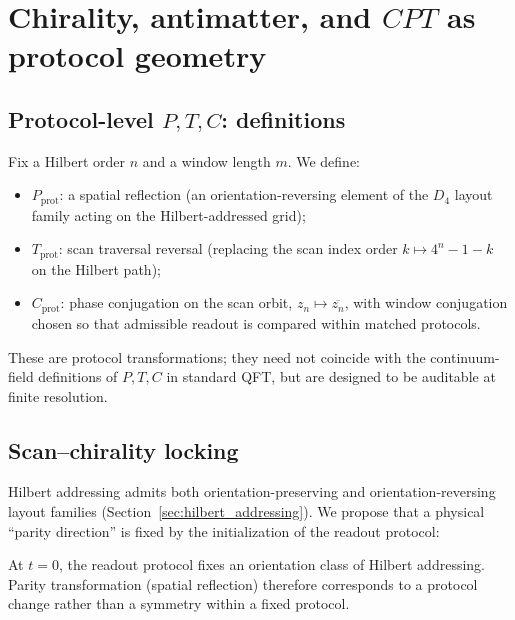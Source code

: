 
\section{Chirality, antimatter, and \texorpdfstring{$CPT$}{CPT} as protocol geometry}
\label{sec:chirality_antimatter}

\subsection{Protocol-level \texorpdfstring{$P,T,C$}{P,T,C}: definitions}
\label{subsec:ptc_definitions}

\begin{definition}\label{def:ptc_protocol}
Fix a Hilbert order $n$ and a window length $m$.
We define:
\begin{itemize}
\item $P_{\mathrm{prot}}$: a spatial reflection (an orientation-reversing element of the $D_4$ layout family acting on the Hilbert-addressed grid);
\item $T_{\mathrm{prot}}$: scan traversal reversal (replacing the scan index order $k\mapsto 4^n-1-k$ on the Hilbert path);
\item $C_{\mathrm{prot}}$: phase conjugation on the scan orbit, $z_n\mapsto \overline{z_n}$, with window conjugation chosen so that admissible readout is compared within matched protocols.
\end{itemize}
These are protocol transformations; they need not coincide with the continuum-field definitions of $P,T,C$ in standard QFT, but are designed to be auditable at finite resolution.
\end{definition}

\subsection{Scan--chirality locking}
\label{subsec:scl}

Hilbert addressing admits both orientation-preserving and orientation-reversing layout families (Section~\ref{sec:hilbert_addressing}).
We propose that a physical ``parity direction'' is fixed by the initialization of the readout protocol:

\begin{assumption}
\label{ax:scl}
At $t=0$, the readout protocol fixes an orientation class of Hilbert addressing.
Parity transformation (spatial reflection) therefore corresponds to a protocol change rather than a symmetry within a fixed protocol.
\end{assumption}

